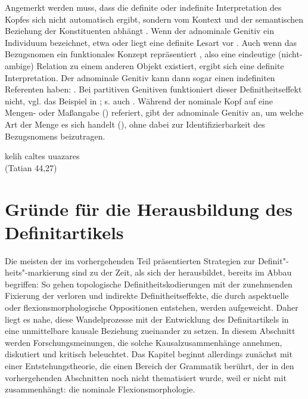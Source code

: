 \noindent
Angemerkt werden muss, dass die definite oder indefinite  Interpretation des Kopfes sich nicht automatisch ergibt, sondern vom Kontext und der semantischen Beziehung der Konstituenten abhängt \parencite[237]{Oubouzar1997}.
Wenn der adnominale Genitiv  ein Individuum bezeichnet, etwa   oder   liegt eine definite Lesart vor \parencite[vgl. auch][194]{Szczepaniak2015}. Auch wenn das Bezugsnomen ein funktionales Konzept repräsentiert \parencite{Lobner1985}, also eine eindeutige (nicht-ambige) Relation zu einem anderen Objekt existiert, ergibt sich eine definite Interpretation. Der adnominale Genitiv  kann dann sogar einen indefiniten  Referenten haben:  \parencite[109]{Demske2001}. Bei partitiven  Genitiven funktioniert dieser Definitheitseffekt  nicht, vgl. das Beispiel in ; s. auch \textcite[][194]{Szczepaniak2015}. Während der nominale Kopf auf eine Mengen- oder Maßangabe () referiert, gibt der adnominale Genitiv  an, um welche Art der Menge es sich handelt (), ohne dabei zur Identifizierbarkeit des Bezugsnomens beizutragen. 

\begin{exe}
	\ex \label{ex:partitiv-ahd}   
	kelih caltes uuazares  \\
	 (Tatian 44,27)
\end{exe}

\section{Gründe für die Herausbildung des Definitartikels}\label{sec:gruende}

Die meisten der im vorhergehenden Teil präsentierten Strategien zur Definit"-heits"-markierung sind zu der Zeit, als sich der  herausbildet, bereits im Abbau begriffen: So gehen topologische Definitheitskodierungen  mit der zunehmenden Fixierung der  verloren und indirekte Definitheitseffekte,  die durch aspektuelle  oder flexionsmorphologische  Oppositionen entstehen, werden aufgeweicht. Daher liegt es nahe, diese Wandelprozesse mit der Entwicklung des Definitartikels  in eine unmittelbare kausale Beziehung zueinander zu setzen. In diesem Abschnitt werden Forschungsmeinungen, die solche Kausalzusammenhänge annehmen, diskutiert und kritisch beleuchtet. Das Kapitel beginnt allerdings zunächst mit einer Entstehungstheorie, die einen Bereich der Grammatik berührt, der in den vorhergehenden Abschnitten noch nicht thematisiert wurde, weil er nicht mit  zusammenhängt: die nominale Flexionsmorphologie. 

